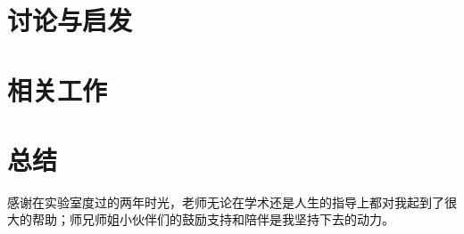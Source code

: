 \documentclass[winfonts]{njuthesis}
\begin{document}
\chapter{讨论与启发}\label{chapter:discusssion}

\chapter{相关工作}\label{chapter:related works}

\chapter{总结}\label{chapter:conclusion}



\begin{acknowledgement}
感谢在实验室度过的两年时光，老师无论在学术还是人生的指导上都对我起到了很大的帮助；师兄师姐小伙伴们的鼓励支持和陪伴是我坚持下去的动力。
\end{acknowledgement}

\end{document}
